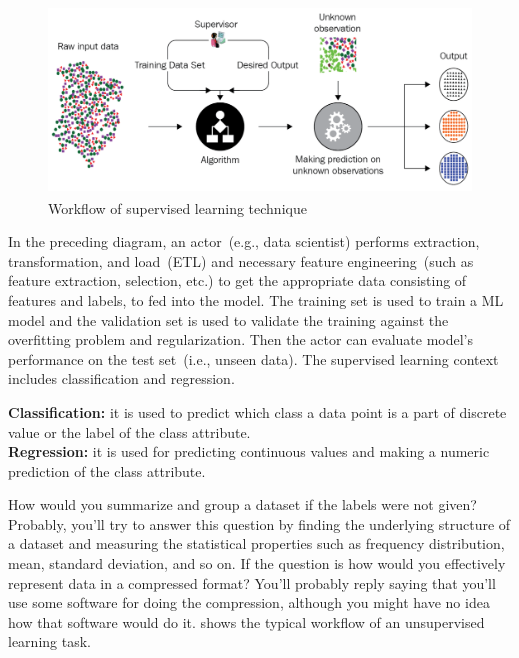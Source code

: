\begin{figure}[h]
	\centering
	\includegraphics[width=0.9\linewidth,height=50mm]{images/sup.png}
	\caption{Workflow of supervised learning technique~\cite{karimScalaML2019}} 
	\label{fig:ml_pipeline_sup}
\end{figure}

\hspace*{3.5mm} In the preceding diagram, an actor~(e.g., data scientist) performs extraction, transformation, and load~(ETL) and necessary feature engineering~(such as feature extraction, selection, etc.) to get the appropriate data consisting of features and labels, to fed into the model. The training set is used to train a ML model and the validation set is used to validate the training against the overfitting problem and regularization. Then the actor can evaluate model's performance on the test set~(i.e., unseen data). The supervised learning context includes classification and regression. 

\vspace{2mm}
\begin{tcolorbox}[colback=white!3!white,colframe=gray!120!black,title=\faBook~Classification vs. regression:]
    \scriptsize{
        \textbf{Classification:} it is used to predict which class a data point is a part of discrete value or the label of the class attribute. \\
        \textbf{Regression:} it is used for predicting continuous values and making a numeric prediction of the class attribute.
        } \\
\end{tcolorbox}

\hspace*{3.5mm} How would you summarize and group a dataset if the labels were not given? Probably, you'll try to answer this question by finding the underlying structure of a dataset and measuring the statistical properties such as frequency distribution, mean, standard deviation, and so on. If the question is how would you effectively represent data in a compressed format? You'll probably reply saying that you'll use some software for doing the compression, although you might have no idea how that software would do it.  shows the typical workflow of an unsupervised learning task. 

